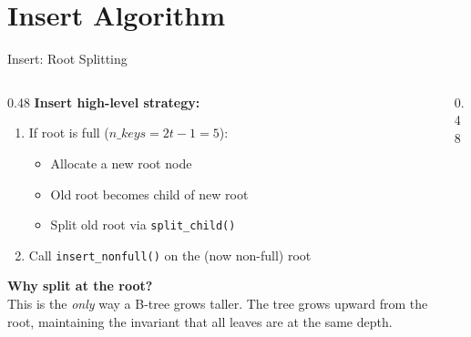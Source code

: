 \documentclass[aspectratio=169, 10pt]{beamer}
\begin{document}
\section{Insert Algorithm}

\begin{frame}{Insert: Root Splitting}
\begin{columns}[T]
\begin{column}{0.48\textwidth}
\textbf{Insert high-level strategy:}
\begin{enumerate}
  \item If root is full ($n\_keys = 2t-1 = 5$):
  \begin{itemize}
    \item Allocate a new root node
    \item Old root becomes child of new root
    \item Split old root via \texttt{split\_child()}
  \end{itemize}
  \item Call \texttt{insert\_nonfull()} on the (now non-full) root
\end{enumerate}

\vspace{0.5em}
\textbf{Why split at the root?}\\
This is the \emph{only} way a B-tree grows taller.
The tree grows upward from the root, maintaining
the invariant that all leaves are at the same depth.
\end{column}

\begin{column}{0.48\textwidth}
\begin{center}
\end{center}
\end{column}
\end{columns}
\end{frame}
\end{document}
